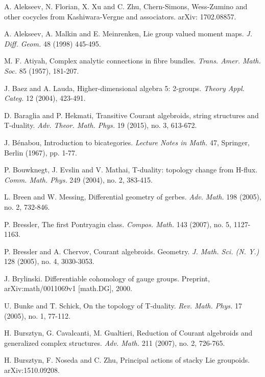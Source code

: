 \documentclass[letterpaper,10pt, oneside]{article} %
\begin{document}
\begin{thebibliography}{}



A. Alekseev, N. Florian, X. Xu and C. Zhu,  Chern-Simons, Wess-Zumino and other cocycles from Kashiwara-Vergne and associators. arXiv: 1702.08857.

A. Alekseev, A. Malkin and E. Meinrenken,  Lie group valued moment maps. {\em J. Diff. Geom.} 48 (1998) 445-495.

M. F. Atiyah, Complex analytic connections in fibre bundles. \emph{Trans. Amer. Math. Soc.} 85  (1957), 181-207.

J. Baez and A. Lauda, Higher-dimensional algebra 5: 2-groups. {\em
Theory Appl. Categ.} 12 (2004), 423-491.

D. Baraglia and P. Hekmati,  Transitive Courant algebroids, string structures and T-duality. \emph{Adv. Theor. Math. Phys.} 19 (2015), no. 3, 613-672.


J. B\'enabou, Introduction to bicategories.
\emph{Lecture Notes in Math.} 47, Springer, Berlin (1967), pp. 1-77.


P. Bouwknegt, J. Evslin and V. Mathai,   T-duality: topology change from H-flux. \emph{Comm. Math. Phys.} 249 (2004), no. 2, 383-415.


L. Breen and W. Messing,   Differential geometry of gerbes. \emph{Adv. Math.} 198 (2005), no. 2, 732-846.

P. Bressler,   The first Pontryagin class. \emph{Compos. Math.} 143 (2007), no. 5, 1127-1163.

P. Bressler and A. Chervov,  Courant algebroids. Geometry. \emph{J. Math. Sci. (N. Y.)} 128 (2005), no. 4, 3030-3053.

J. Brylinski. Differentiable cohomology of gauge groups. Preprint, arXiv:math/0011069v1 [math.DG], 2000.

U. Bunke and T. Schick,   On the topology of T-duality. \emph{Rev. Math. Phys.} 17 (2005), no. 1, 77-112.

H. Bursztyn, G. Cavalcanti, M. Gualtieri, Reduction of Courant algebroids and generalized
complex structures. \emph{Adv. Math.} 211 (2007), no. 2, 726-765.


H. Bursztyn, F. Noseda and C. Zhu, Principal actions of stacky Lie groupoids. 	arXiv:1510.09208.



\end{thebibliography}
\end{document}
